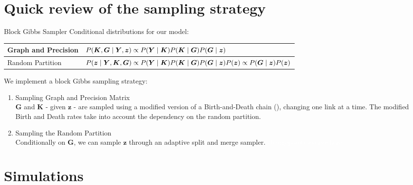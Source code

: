 \section{Quick review of the sampling strategy}

\begin{frame}{Block Gibbs Sampler}
    Conditional distributions for our model:
    \begin{table}[tb]
        \centering
        \begin{tabular}{ll}
        \toprule
        Graph and Precision & $\small P(\bm{K},\bm{G} \mid \bm{Y},\bm{z}) \propto P(\bm{Y} \mid \bm{K})P(\bm{K} \mid \bm{G}) P(\bm{G} \mid \bm{z})$ \\
        \hline
        Random Partition & $\small P(\bm{z} \mid \bm{Y},\bm{K},\bm{G}) \propto P(\bm{Y} \mid \bm{K})P(\bm{K} \mid \bm{G})P(\bm{G} \mid \bm{z})P(\bm{z}) \propto P(\bm{G} \mid \bm{z})P(\bm{z}) $ \\
        \bottomrule
        \end{tabular}
    \end{table}

    \pause 

    We implement a block Gibbs sampling strategy:
    \begin{enumerate}
        \item \alert{Sampling Graph and Precision Matrix}\\
        $\bm{G}$ and $\bm{K}$ - given $\bm{z}$ - are sampled using a modified version of a Birth-and-Death chain (\cite{mohammadiBayesianStructureLearning2015a}), changing one link at a time. The modified Birth and Death rates take into account the dependency on the random partition.
        \item \alert{Sampling the Random Partition}\\
        Conditionally on $\bm{G}$, we can sample $\bm{z}$ through an adaptive split and merge sampler. \textcolor{white}{changepoints everywhere}
    \end{enumerate}
\end{frame}


\section{Simulations}

